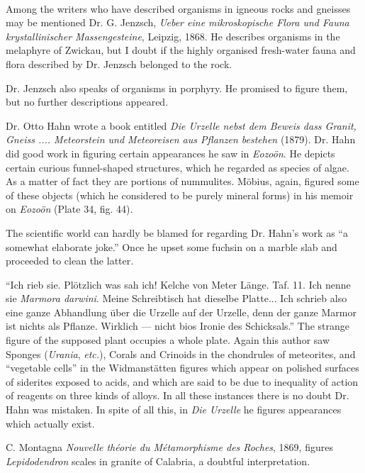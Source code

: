 \documentclass[a4paper, 12pt, oneside]{article}
\begin{document}
\paragraph{}
Among the writers who have described organisms in igneous rocks and gneisses may be mentioned Dr. G. Jenzsch, \emph{Ueber eine mikroskopische Flora und Fauna krystallinischer Massengesteine}, Leipzig, 1868. He describes organisms in the melaphyre of Zwickau, but I doubt if the highly organised fresh-water fauna and flora described by Dr. Jenzsch belonged to the rock.

Dr. Jenzsch also speaks of organisms in porphyry. He promised to figure them, but no further descriptions appeared.

Dr. Otto Hahn wrote a book entitled \emph{Die Urzelle nebst dem Beweis dass Granit, Gneiss .... Meteorstein und Meteoreisen aus Pflanzen bestehen} (1879). Dr. Hahn did good work in figuring certain appearances he saw in \emph{Eozoön}. He depicts certain curious funnel-shaped structures, which he regarded as species of algae. As a matter of fact they are portions of nummulites. Möbius, again, figured some of these objects (which he considered to be purely mineral forms) in his memoir on \emph{Eozoön} (Plate 34, fig. 44).

The scientific world can hardly be blamed for regarding Dr. Hahn's work as ``a somewhat elaborate joke.'' Once he upset some fuchsin on a marble slab and proceeded to clean the latter.

``Ich rieb sie. Plötzlich was sah ich! Kelche von Meter Länge. Taf. 11. Ich nenne sie \emph{Marmora darwini}. Meine Schreibtisch hat dieselbe Platte... Ich schrieb also eine ganze Abhandlung über die Urzelle auf der Urzelle, denn der ganze Marmor ist nichts als Pflanze. Wirklich --- nicht bios Ironie des Schicksals.'' The strange figure of the supposed plant occupies a whole plate. Again this author saw Sponges (\emph{Urania}, \emph{etc.}), Corals and Crinoids in the chondrules of meteorites, and ``vegetable cells'' in the Widmanstätten figures which appear on polished surfaces of siderites exposed to acids, and which are said to be due to inequality of action of reagents on three kinds of alloys. In all these instances there is no doubt Dr. Hahn was mistaken. In spite of all this, in \emph{Die Urzelle} he figures appearances which actually exist.

C. Montagna \emph{Nouvelle théorie du Métamorphisme des Roches}, 1869, figures \emph{Lepidodendron} scales in granite of Calabria, a doubtful interpretation.
\end{document}
